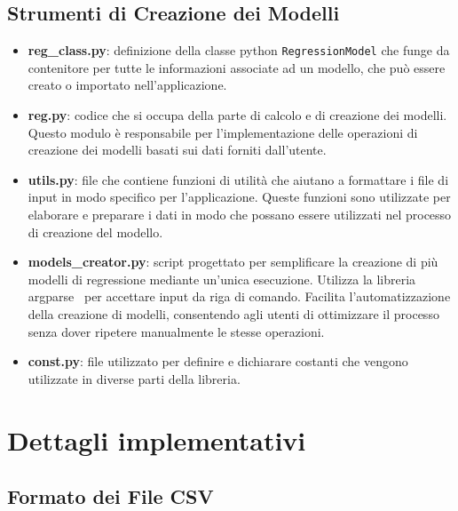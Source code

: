 \documentclass{rapportECL}
\begin{document}
\section{Strumenti di Creazione dei Modelli}
\begin{itemize}
  \item \textbf{reg\_class.py}: definizione della classe python \texttt{RegressionModel} che funge da contenitore per tutte le
  informazioni associate ad un modello, che può essere creato o importato nell'applicazione.
  \item \textbf{reg.py}: codice che si occupa della parte di calcolo e di creazione dei modelli. Questo modulo è responsabile 
  per l'implementazione delle operazioni di creazione dei modelli basati sui dati forniti dall'utente.
  \item \textbf{utils.py}: file che contiene funzioni di utilità che aiutano a formattare i file di input in modo specifico per l'applicazione. 
  Queste funzioni sono utilizzate per elaborare e preparare i dati in modo che possano essere utilizzati nel processo di creazione del modello.
  \item \textbf{models\_creator.py}: script progettato per semplificare la creazione di più modelli di regressione mediante un'unica esecuzione. 
  Utilizza la libreria argparse~\cite{argparse} per accettare input da riga di comando.  Facilita l'automatizzazione della creazione di modelli, 
  consentendo agli utenti di ottimizzare il processo senza dover ripetere manualmente le stesse operazioni.
  \item \textbf{const.py}: file utilizzato per definire e dichiarare costanti che vengono utilizzate in diverse parti della libreria.
\end{itemize}


\chapter{Dettagli implementativi}
\label{cha:scelte}

\section{Formato dei File CSV}
\end{document}
